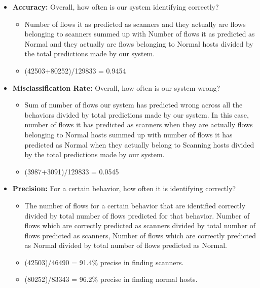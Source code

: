 \begin{itemize}
	\item \textbf{Accuracy:} Overall, how often is our system identifying correctly?
	\begin{itemize}
	
	\item Number of flows it as predicted as scanners and they  actually are flows belonging to scanners summed up with Number of flows it as predicted as Normal and they  actually are flows belonging to Normal hosts divided by the total predictions made by our system.
	
	\item (42503+80252)/129833 = 0.9454
	
	\end{itemize}

	\item \textbf{Misclassification Rate:} Overall, how often is our system wrong?
	\begin{itemize}
		
		\item Sum of number of flows our system has predicted wrong across all the behaviors divided by total predictions made by our system. In this case, number of flows it has predicted as scanners when they are actually flows belonging to Normal hosts summed up with number of flows it has predicted as Normal when they actually belong to Scanning hosts divided by the total predictions made by our system.
		
		\item (3987+3091)/129833 = 0.0545
	\end{itemize}
	
	\item \textbf{Precision:} For a certain behavior, how often it is identifying correctly?
	\begin{itemize}
		
		\item 
		 The number of flows for a certain behavior that are identified correctly divided by total number of flows predicted for that behavior.
		 Number of flows which are correctly predicted as scanners divided by total number of flows predicted as scanners, Number of flows which are correctly predicted as Normal divided by total number of flows predicted as Normal. 
		
		\item (42503)/46490 = 91.4\% precise in finding scanners.
		
		\item (80252)/83343 = 96.2\% precise in finding normal hosts.
			
	\end{itemize}

\end{itemize}


